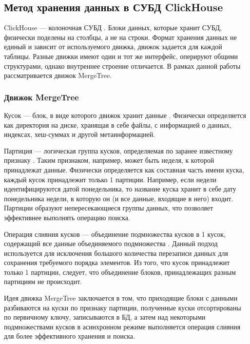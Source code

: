 \clearpage

\subsection{Метод хранения данных в СУБД ClickHouse}

ClickHouse --- колоночная СУБД \cite{ch}. Блоки данных, которые хранит СУБД, физически поделены на столбцы, а не на строки. Формат хранения данных не единый и зависит от используемого движка, движок задается для каждой таблицы. Разные движки имеют один и тот же интерфейс, оперируют общими структурами, однако внутреннее строение отличается. В рамках данной работы рассматривается движок MergeTree.

\subsubsection{Движок MergeTree}

Кусок --- блок, в виде которого движок хранит данные \cite{mergetreearch}. Физически определяется как директория на диске, хранящая в себе файлы, с информацией о данных, индексах, хеш-суммах и другой метаинформацией.

Партиция --- логическая группа кусков, определяемая по заранее известному признаку \cite{mergetreearch}. Таким признаком, например, может быть неделя, к которой принадлежат данные. Физически определяется как составная часть имени куска, каждый кусок принадлежит только 1 партиции. Например, если недели идентифицируются датой понедельника, то название куска хранит в себе дату понедельника недели, в которую он (и все данные, входящие в него) входит. Партиции образуют непересекающиеся группы данных, что позволяет эффективнее выполнять операцию поиска.

Операция слияния кусков --- объединение подмножества кусков в 1 кусок, содержащий все данные объединяемого подмножества \cite{mergetreearch}. Данный подход используется для исключения большого количества перезаписи данных для сохранения требуемого порядка элементов. Из того, что кусок принадлежит только 1 партиции, следует, что объединение блоков, принадлежащих разным партициям не происходит.

Идея движка MergeTree заключается в том, что приходящие блоки с данными разбиваются на куски по признаку партиции, полученные куски отсортированы по первичному ключу, записываются в БД, а затем над некоторыми подмножествами кусков в асинхронном режиме выполняется операция слияния для более эффективного хранения и поиска.

